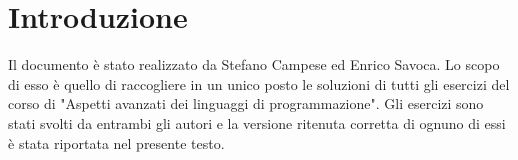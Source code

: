 \section{Introduzione}
Il documento è stato realizzato da Stefano Campese ed Enrico Savoca. Lo scopo di esso è quello di raccogliere in un unico posto le soluzioni di tutti gli esercizi del corso di "Aspetti avanzati dei linguaggi di programmazione". Gli esercizi sono stati svolti da entrambi gli autori e la versione ritenuta corretta di ognuno di essi è stata riportata nel presente testo.
